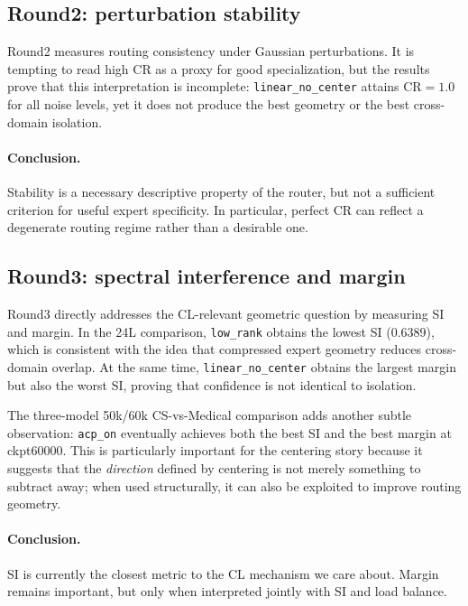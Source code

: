 \documentclass[11pt]{article}
\begin{document}
\subsection{Round2: perturbation stability}
Round2 measures routing consistency under Gaussian perturbations. It is tempting to read high CR as a proxy for good specialization, but the results prove that this interpretation is incomplete: \texttt{linear\_no\_center} attains CR$=1.0$ for all noise levels, yet it does not produce the best geometry or the best cross-domain isolation.

\paragraph{Conclusion.} Stability is a necessary descriptive property of the router, but not a sufficient criterion for useful expert specificity. In particular, perfect CR can reflect a degenerate routing regime rather than a desirable one.

\subsection{Round3: spectral interference and margin}
Round3 directly addresses the CL-relevant geometric question by measuring SI and margin. In the 24L comparison, \texttt{low\_rank} obtains the lowest SI (0.6389), which is consistent with the idea that compressed expert geometry reduces cross-domain overlap. At the same time, \texttt{linear\_no\_center} obtains the largest margin but also the worst SI, proving that confidence is not identical to isolation.

The three-model 50k/60k CS-vs-Medical comparison adds another subtle observation: \texttt{acp\_on} eventually achieves both the best SI and the best margin at ckpt60000. This is particularly important for the centering story because it suggests that the \emph{direction} defined by centering is not merely something to subtract away; when used structurally, it can also be exploited to improve routing geometry.

\paragraph{Conclusion.} SI is currently the closest metric to the CL mechanism we care about. Margin remains important, but only when interpreted jointly with SI and load balance.
\end{document}
